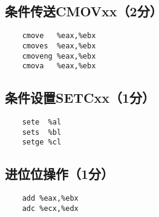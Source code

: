 \subsection{条件传送CMOVxx（2分）}
\begin{verbatim}
    cmove   %eax,%ebx
    cmoves  %eax,%ebx
    cmoveng %eax,%ebx
    cmova   %eax,%ebx
\end{verbatim}

\subsection{条件设置SETCxx（1分）}
\begin{verbatim}
    sete  %al
    sets  %bl
    setge %cl
\end{verbatim}

\subsection{进位位操作（1分）}
\begin{verbatim}
    add %eax,%ebx
    adc %ecx,%edx
\end{verbatim}